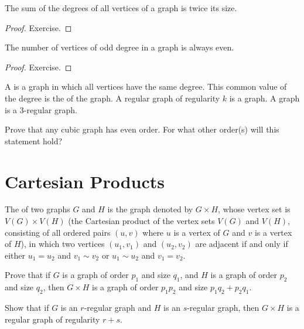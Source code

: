 \begin{Lemma}
The sum of the degrees of all vertices of a graph is twice its size.
\end{Lemma}

\begin{proof}
Exercise.
\end{proof}

\begin{Corollary}
The number of vertices of odd degree in a graph is always even.
\end{Corollary}

\begin{proof}
Exercise.
\end{proof}

A  is a graph in which all vertices have the same degree. This common value of the degree is the  of the graph. A regular graph of regularity $k$ is a  graph. A  graph is a $3$-regular graph.

\begin{Exercise}
Prove that any cubic graph has even order. For what other order(s) will this statement hold?
\end{Exercise}

\section{Cartesian Products}\label{sec:CartProds}

The  of two graphs $G$ and $H$ is the graph denoted by $G \times H$, whose vertex set is $V(G) \times V(H)$ (the Cartesian product of the vertex sets $V(G)$ and $V(H)$, consisting of all ordered pairs $(u, v)$ where $u$ is a vertex of $G$ and $v$ is a vertex of $H$), in which two vertices $(u_1, v_1)$ and $(u_2, v_2)$ are adjacent if and only if either $u_1 = u_2$ and $v_1 \sim v_2$ or $u_1 \sim u_2$ and $v_1 = v_2$.

\begin{Exercise}
Prove that if $G$ is a graph of order $p_1$ and size $q_1$, and $H$ is a graph of order $p_2$ and size $q_2$, then $G \times H$ is a graph of order $p_1 p_2$ and size $p_1 q_2 + p_2 q_1$.
\end{Exercise}

\begin{Exercise}
Show that if $G$ is an $r$-regular graph and $H$ is an $s$-regular graph, then $G \times H$ is a regular graph of regularity $r + s$.
\end{Exercise}

